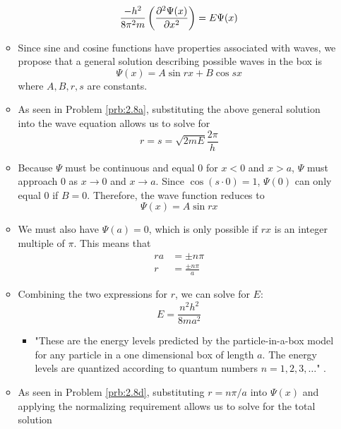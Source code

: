 \documentclass[../main.tex]{subfiles}
\begin{document}
\begin{itemize}
\begin{itemize}
        \begin{equation*}
            \frac{-h^2}{8\pi^2m}\left( \pdv[2]{\Psi(x)}{x} \right) = E\Psi(x)
        \end{equation*}
        \item Since sine and cosine functions have properties associated with waves, we propose that a general solution describing possible waves in the box is
        \begin{equation*}
            \Psi(x) = A\sin rx+B\cos sx
        \end{equation*}
        where $A,B,r,s$ are constants.
        \item As seen in Problem \ref{prb:2.8a}, substituting the above general solution into the wave equation allows us to solve for
        \begin{equation*}
            r = s = \sqrt{2mE}\frac{2\pi}{h}
        \end{equation*}
        \item Because $\Psi$ must be continuous and equal 0 for $x<0$ and $x>a$, $\Psi$ must approach 0 as $x\to 0$ and $x\to a$. Since $\cos(s\cdot 0)=1$, $\Psi(0)$ can only equal 0 if $B=0$. Therefore, the wave function reduces to
        \begin{equation*}
            \Psi(x) = A\sin rx
        \end{equation*}
        \item We must also have $\Psi(a)=0$, which is only possible if $rx$ is an integer multiple of $\pi$. This means that
        \begin{align*}
            ra &= \pm n\pi\\
            r &= \frac{\pm n\pi}{a}
        \end{align*}
        \item Combining the two expressions for $r$, we can solve for $E$:
        \begin{equation*}
            E = \frac{n^2h^2}{8ma^2}
        \end{equation*}
        \begin{itemize}
            \item "These are the energy levels predicted by the particle-in-a-box model for any particle in a one dimensional box of length $a$. The energy levels are quantized according to quantum numbers $n=1,2,3,\dots$" \parencite[17]{bib:MiesslerFischerTarr}.
        \end{itemize}
        \item As seen in Problem \ref{prb:2.8d}, substituting $r=n\pi/a$ into $\Psi(x)$ and applying the normalizing requirement allows us to solve for the total solution

\end{itemize}
\end{itemize}
\end{document}
